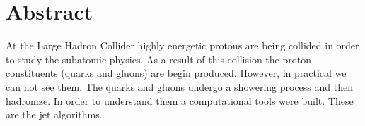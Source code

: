 
\chapter*{Abstract} 
At the Large Hadron Collider highly energetic protons are being collided in order to study the subatomic physics. As a result of this collision the proton constituents (quarks and gluons) are begin produced. However, in practical we can not see them. The quarks and gluons undergo a showering process and then hadronize. In order to understand them a computational tools were built. These are the jet algorithms.  
%
%
%
%




